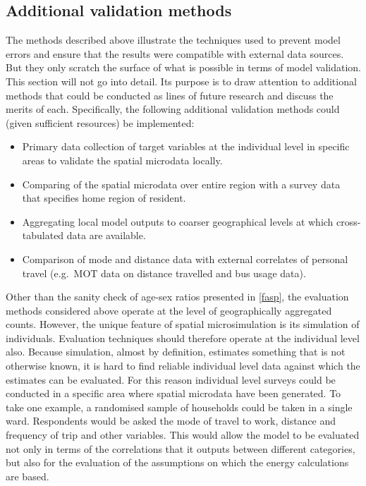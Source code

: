 \subsection{Additional validation methods}
The methods described above illustrate the techniques used to prevent
model errors and ensure that the results were compatible with external data
sources. But they only scratch the surface of what is possible in terms of
model validation. This section will not go into detail. Its
purpose is to draw attention to
additional methods that could be conducted as lines of future research
and discuss the merits of each. Specifically, the following additional validation
methods could (given sufficient resources) be implemented:
\begin{itemize}
 \item Primary data collection of target variables at the individual level
 in specific areas to  validate the spatial microdata locally.
 \item Comparing of the spatial microdata over entire region with a
 survey data that specifies home region of resident.
 \item Aggregating local model outputs to coarser geographical levels at which
 cross-tabulated data are available.
 \item Comparison of mode and distance data with external correlates of personal
 travel (e.g.~MOT data on distance travelled and bus usage data).
\end{itemize}

Other than the sanity check of age-sex ratios presented in \cref{fasp},
the evaluation methods considered above operate at the level of geographically
aggregated counts. However, the unique feature of spatial microsimulation is
its simulation of individuals. Evaluation techniques should therefore operate
at the individual level also.
%
Because simulation, almost by definition, estimates something that is not
otherwise known, it is hard to find reliable individual level
data against which the estimates can be evaluated. For this reason
individual level surveys could be conducted in a specific area where
spatial microdata have been generated. To take one example, a randomised
sample of households could be taken in a single ward. Respondents would be
asked the mode of travel to work, distance and frequency of trip and
other variables. This would allow the model to be evaluated
not only in terms of the correlations that it outputs between different categories,
but also for the evaluation of the assumptions on which the energy calculations %
are based.

